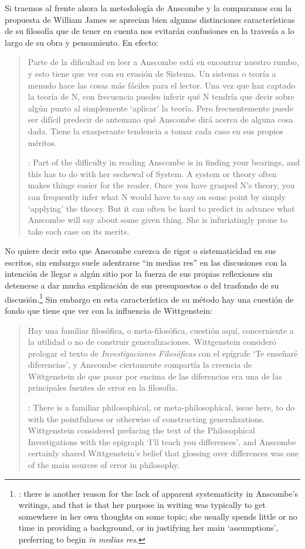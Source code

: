 Si traemos al frente ahora la metodología de Anscombe y la comparamos con la
propuesta de William James se aprecian bien algunas distinciones características
de su filosofía que de tener en cuenta nos evitarán confusiones en la travesía a
lo largo de su obra y pensamiento. En efecto:
\blockquote[{\cite[1]{teichmann2008ans}}: Part of the difficulty in reading
Anscombe is in finding your bearings, and this has to do with her eschewal of
System. A system or theory often makes things easier for the reader. Once you
have grasped N's theory, you can frequently infer what N would have to say on
some point by simply `applying' the theory. But it can often be hard to predict
in advance what Anscombe will say about some given thing. She is infuriatingly
prone to take each case on its merits.]{Parte de la dificultad en leer a
  Anscombe está en encontrar nuestro rumbo, y esto tiene que ver con su evasión
  de Sistema. Un sistema o teoría a menudo hace las cosas más fáciles para el
  lector. Una vez que haz captado la teoría de N, con frecuencia puedes inferir
  qué N tendría que decir sobre algún punto al simplemente \enquote*{aplicar} la
  teoría. Pero frecuentemente puede ser difícil predecir de antemano qué
  Anscombe dirá acerca de alguna cosa dada. Tiene la exasperante tendencia a
  tomar cada caso en sus propios méritos.}
No quiere decir esto que Anscombe carezca de rigor o sistematicidad en sus
escritos, sin embargo suele adentrarse \enquote{in medias res} en las
discusiones con la intención de llegar a algún sitio por la fuerza de sus
propias reflexiones sin detenerse a dar mucha explicación de sus presupuestos o
del trasfondo de su discusión.\footnote{\cite[Cf.~][1]{teichmann2008ans}:
  \textelp{} there is another reason for the lack of apparent systematicity in
  Anscombe's writings, and that is that her purpose in writing was typically to
  get somewhere in her own thoughts on some topic; she usually spends little or
  no time in providing a background, or in justifying her main `assumptions',
  preferring to begin \emph{in medias res}.} Sin embargo en esta característica
de su método hay una cuestión de fondo que tiene que ver con la influencia de
Wittgenstein:
\blockquote[{\cite[1]{teichmann2008ans}}: There is a familiar philosophical, or
meta-philosophical, issue here, to do with the pointfulness or otherwise of
constructing generalizations. Wittgenstein considered prefacing the text of the
Philosophical Investigations with the epigraph `I'll teach you differences', and
Anscombe certainly shared Wittgenstein's belief that glossing over differences
was one of the main sources of error in philosophy.]{Hay una familiar
  filosófica, o meta-filosófica, cuestión aquí, concerniente a la utilidad o no
  de construir generalizaciones. Wittgenstein consideró prologar el texto de
  \emph{Investigaciones Filosóficas} con el epígrafe \enquote*{Te enseñaré
    diferencias}, y Anscombe ciertamente compartía la creencia de Wittgenstein
  de que pasar por encima de las diferencias era una de las principales fuentes
  de error en la filosofía.}

